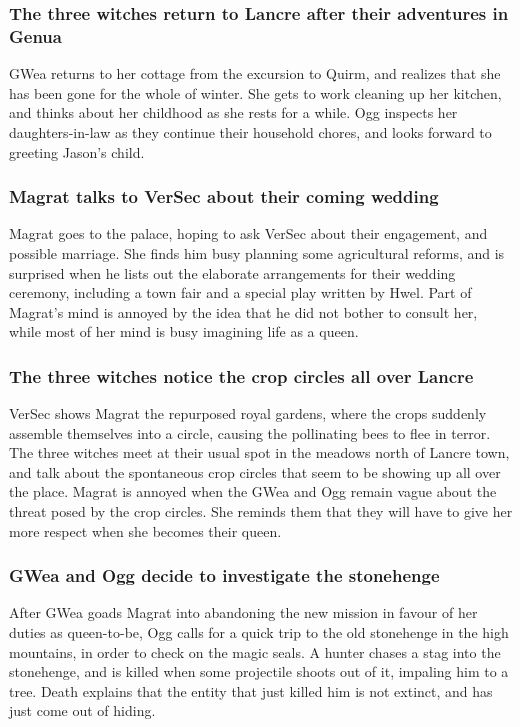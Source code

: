 \subsubsection{The three witches return to Lancre after their adventures in Genua}
\Gls{GWea} returns to her cottage from the excursion to Quirm, and realizes that she has been gone
for the whole of winter. She gets to work cleaning up her kitchen, and thinks about her childhood as
she rests for a while. \Gls{Ogg} inspects her daughters-in-law as they continue their household
chores, and looks forward to greeting \Gls{Jason}'s child.

\subsubsection{\Gls{Magrat} talks to \Gls{VerSec} about their coming wedding}
\Gls{Magrat} goes to the palace, hoping to ask \Gls{VerSec} about their engagement, and possible
marriage. She finds him busy planning some agricultural reforms, and is surprised when he lists out
the elaborate arrangements for their wedding ceremony, including a town fair and a special play
written by \Gls{Hwel}. Part of \Gls{Magrat}'s mind is annoyed by the idea that he did not bother to
consult her, while most of her mind is busy imagining life as a queen.

\subsubsection{The three witches notice the crop circles all over Lancre}
\Gls{VerSec} shows \Gls{Magrat} the repurposed royal gardens, where the crops suddenly assemble
themselves into a circle, causing the pollinating bees to flee in terror. The three witches meet
at their usual spot in the meadows north of Lancre town, and talk about the spontaneous crop circles
that seem to be showing up all over the place. \Gls{Magrat} is annoyed when the \Gls{GWea} and
\Gls{Ogg} remain vague about the threat posed by the crop circles. She reminds them that they will
have to give her more respect when she becomes their queen.

\subsubsection{\Gls{GWea} and \Gls{Ogg} decide to investigate the stonehenge}
After \Gls{GWea} goads \Gls{Magrat} into abandoning the new mission in favour of her duties as
queen-to-be, \Gls{Ogg} calls for a quick trip to the old stonehenge in the high mountains, in order
to check on the magic seals. A hunter chases a stag into the stonehenge, and is killed when
some projectile shoots out of it, impaling him to a tree. \Gls{Death} explains that the entity that
just killed him is not extinct, and has just come out of hiding.

